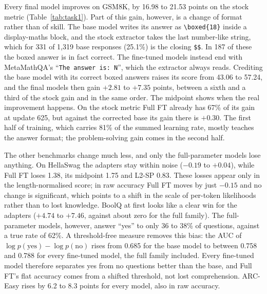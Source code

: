 Every final model improves on GSM8K, by 16.98 to 21.53 points on the stock metric (Table~\ref{tab:task1}). Part of this gain, however, is a change of format rather than of skill. The base model writes its answer as \texttt{\textbackslash boxed\{18\}} inside a display-maths block, and the stock extractor takes the last number-like string, which for 331 of 1,319 base responses (25.1\%) is the closing \texttt{\$\$}. In 187 of these the boxed answer is in fact correct. The fine-tuned models instead end with MetaMathQA's ``\texttt{The answer is: N}'', which the extractor always reads. Crediting the base model with its correct boxed answers raises its score from 43.06 to 57.24, and the final models then gain $+2.81$ to $+7.35$ points, between a sixth and a third of the stock gain and in the same order. The midpoint shows when the real improvement happens. On the stock metric Full FT already has 67\% of its gain at update 625, but against the corrected base its gain there is $+0.30$. The first half of training, which carries 81\% of the summed learning rate, mostly teaches the answer format; the problem-solving gain comes in the second half.

The other benchmarks change much less, and only the full-parameter models lose anything. On HellaSwag the adapters stay within noise ($-0.19$ to $+0.04$), while Full FT loses 1.38, its midpoint 1.75 and L2-SP 0.83. These losses appear only in the length-normalised score; in raw accuracy Full FT moves by just $-0.15$ and no change is significant, which points to a shift in the scale of per-token likelihoods rather than to lost knowledge. BoolQ at first looks like a clear win for the adapters ($+4.74$ to $+7.46$, against about zero for the full family). The full-parameter models, however, answer ``yes'' to only 36 to 38\% of questions, against a true rate of 62\%. A threshold-free measure removes this bias: the AUC of $\log p(\text{yes})-\log p(\text{no})$ rises from 0.685 for the base model to between 0.758 and 0.788 for every fine-tuned model, the full family included. Every fine-tuned model therefore separates yes from no questions better than the base, and Full FT's flat accuracy comes from a shifted threshold, not lost comprehension. ARC-Easy rises by 6.2 to 8.3 points for every model, also in raw accuracy.

